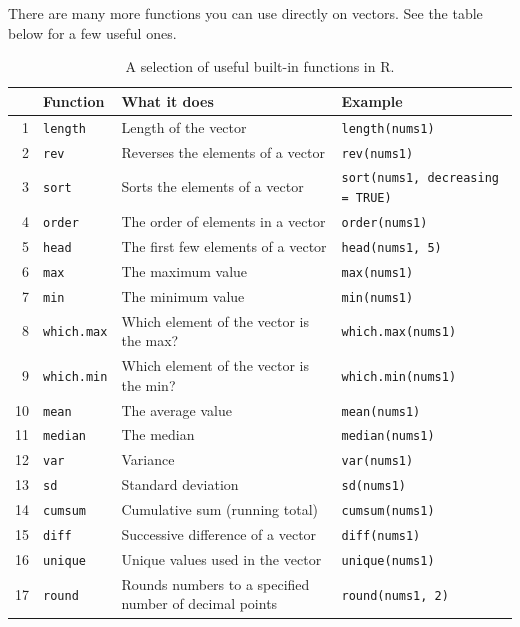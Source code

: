 \documentclass[]{book}
\begin{document}
There are many more functions you can use directly on vectors. See the table below for a few useful ones.

\begin{table}[ht]
\centering
\begin{tabular}{rlll}
  \hline
 & Function & What it does & Example \\ 
  \hline
1 & \texttt{length} & Length of the vector & \texttt{length(nums1)} \\ 
  2 & \texttt{rev} & Reverses the elements of a vector & \texttt{rev(nums1)} \\ 
  3 & \texttt{sort} & Sorts the elements of a vector & \texttt{sort(nums1, decreasing = TRUE)} \\ 
  4 & \texttt{order} & The order of elements in a vector & \texttt{order(nums1)} \\ 
  5 & \texttt{head} & The first few elements of a vector & \texttt{head(nums1, 5)} \\ 
  6 & \texttt{max} & The maximum value & \texttt{max(nums1)} \\ 
  7 & \texttt{min} & The minimum value & \texttt{min(nums1)} \\ 
  8 & \texttt{which.max} & Which element of the vector is the max? & \texttt{which.max(nums1)} \\ 
  9 & \texttt{which.min} & Which element of the vector is the min? & \texttt{which.min(nums1)} \\ 
  10 & \texttt{mean} & The average value & \texttt{mean(nums1)} \\ 
  11 & \texttt{median} & The median & \texttt{median(nums1)} \\ 
  12 & \texttt{var} & Variance & \texttt{var(nums1)} \\ 
  13 & \texttt{sd} & Standard deviation & \texttt{sd(nums1)} \\ 
  14 & \texttt{cumsum} & Cumulative sum (running total) & \texttt{cumsum(nums1)} \\ 
  15 & \texttt{diff} & Successive difference of a vector & \texttt{diff(nums1)} \\ 
  16 & \texttt{unique} & Unique values used in the vector & \texttt{unique(nums1)} \\ 
  17 & \texttt{round} & Rounds numbers to a specified number of decimal points & \texttt{round(nums1, 2)} \\ 
   \hline
\end{tabular}
\caption{A selection of useful built-in functions in R.} 
\end{table}
\end{document}
